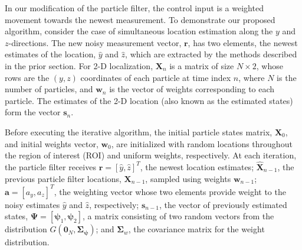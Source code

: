 \documentclass[10pt,journal,final]{IEEEtran}
\begin{document}
In our modification of the particle filter, the control input is a weighted movement towards the newest measurement. 
To demonstrate our proposed algorithm, consider the case of simultaneous location estimation along the $y$ and $z$-directions.
The new noisy measurement vector, $\mathbf{r}$, has two elements, the newest estimates of the location, $\hat{y}$ and $\hat{z}$, which are extracted by the methods described in the prior section.
For 2-D localization, $\mathbf{X}_n$ is a matrix of size $N \times 2$, whose rows are the $(y,z)$ coordinates of each particle at time index $n$, where $N$ is the number of particles, and $\mathbf{w}_n$ is the vector of weights corresponding to each particle.
The estimates of the 2-D location (also known as the estimated states) form the vector $\mathbf{s}_n$.

Before executing the iterative algorithm, the initial particle states matrix, $\mathbf{X}_{0}$, and initial weights vector, $\mathbf{w}_{0}$, are initialized with random locations throughout the region of interest (ROI) and uniform weights, respectively. 
At each iteration, the particle filter receives $\mathbf{r} = [\hat{y},\hat{z}]^T$, the newest location estimates; $\mathbf{\hat{X}}_{n-1}$, the previous particle filter locations, $\mathbf{X}_{n-1}$, sampled using weights $\mathbf{w}_{n-1}$; $\mathbf{a} = [a_y, a_z]^T$, the weighting vector whose two elements provide weight to the noisy estimates $\hat{y}$ and $\hat{z}$, respectively; $\mathbf{s}_{n-1}$, the vector of previously estimated states, $\mathbf{\Psi} = [\bm{\psi}_1, \bm{\psi}_2]$, a matrix consisting of two random vectors from the distribution $G(\mathbf{0}_N,\mathbf{\Sigma_\psi})$; and $\mathbf{\Sigma}_w$, the covariance matrix for the weight distribution.
\end{document}
